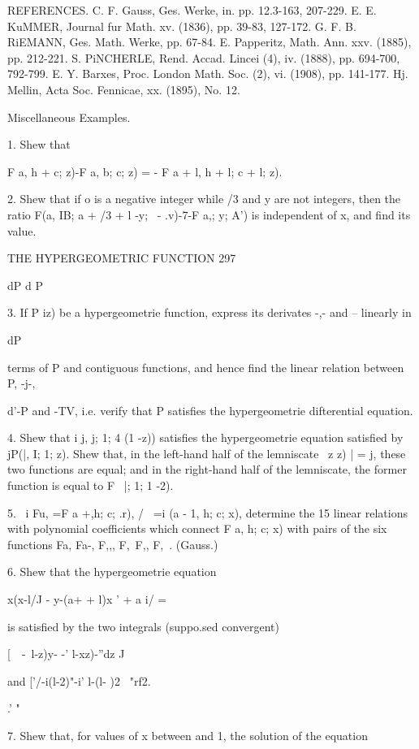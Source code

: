 REFERENCES. C. F. Gauss, Ges. Werke, in. pp. 12.3-163, 207-229. E. E.
KuMMER, Journal fur Math. xv. (1836), pp. 39-83, 127-172. G. F. B.
RiEMANN, Ges. Math. Werke, pp. 67-84. E. Papperitz, Math. Ann. xxv.
(1885), pp. 212-221. S. PiNCHERLE, Rend. Accad. Lincei (4), iv.
(1888), pp. 694-700, 792-799. E. Y. Barxes, Proc. London Math. Soc.
(2), vi. (1908), pp. 141-177. Hj. Mellin, Acta Soc. Fennicae, xx.
(1895), No. 12.

Miscellaneous Examples.

1. Shew that

F a, h + \; c; z)-F a, b; c; z) = - F a + l, h + l; c + l; z).

2. Shew that if o is a negative integer while /3 and y are not
integers, then the ratio F(a, IB; a + /3 + l -y; \ - .v)-7-F a,; y;
A') is independent of x, and find its value.

THE HYPERGEOMETRIC FUNCTION 297

dP d P

3. If P iz) be a hypergeometrie function, express its derivates -,-
and -- linearly in

dP

terms of P and contiguous functions, and hence find the linear
relation between P, -j-,

d'-P and -TV, i.e. verify that P satisfies the hypergeometrie
difterential equation.

4. Shew that i j, j; 1; 4 (1 -z)) satisfies the hypergeometrie
equation satisfied by jP(|, I; 1; z). Shew that, in the left-hand
half of the lemniscate \ z z) | = j, these two functions are equal;
and in the right-hand half of the lemniscate, the former function is
equal to F \, |; 1; 1 -2).

5. \ i Fu, =F a +,h; c; .r), / \ =i (a - 1, h; c; x), determine the
15 linear relations with polynomial coefficients which connect F a, h;
c; x) with pairs of the six functions Fa, Fa-, F,,, F,\, F,, F,\ .
(Gauss.)

6. Shew that the hypergeometrie equation

x(x-l/J - y-(a+ + l)x ' + a i/ =

is satisfied by the two integrals (suppo.sed convergent)

[\ \ -\ l-z)y- -' l-xz)-''dz J

and ['/-i(l-2)"-i' l-(l- )2 ~"rf2.

.' "

7. Shew that, for values of x between and 1, the solution of the
equation

